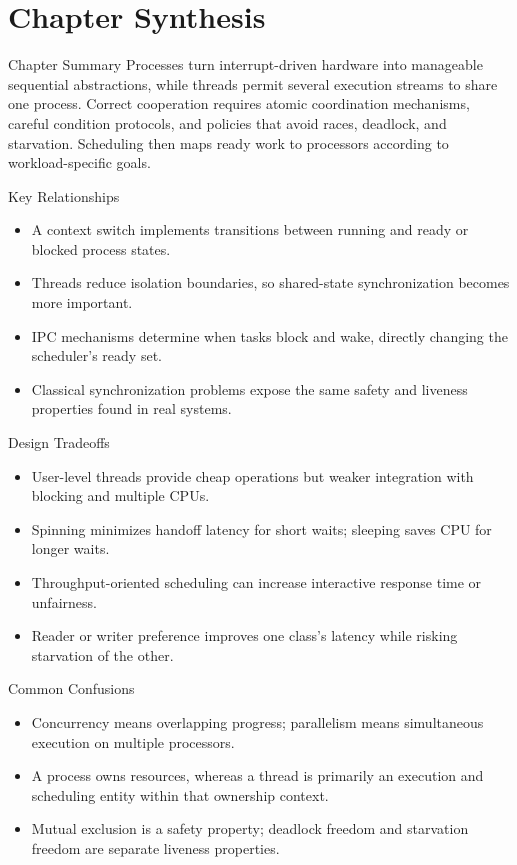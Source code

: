 \documentclass[10pt,letterpaper]{article}
\begin{document}
\section*{Chapter Synthesis}
\begin{studybox}{Chapter Summary}
Processes turn interrupt-driven hardware into manageable sequential abstractions, while threads permit several execution streams to share one process. Correct cooperation requires atomic coordination mechanisms, careful condition protocols, and policies that avoid races, deadlock, and starvation. Scheduling then maps ready work to processors according to workload-specific goals.
\end{studybox}

\begin{studybox}{Key Relationships}
\begin{itemize}
  \item A context switch implements transitions between running and ready or blocked process states.
  \item Threads reduce isolation boundaries, so shared-state synchronization becomes more important.
  \item IPC mechanisms determine when tasks block and wake, directly changing the scheduler's ready set.
  \item Classical synchronization problems expose the same safety and liveness properties found in real systems.
\end{itemize}
\end{studybox}

\begin{studybox}{Design Tradeoffs}
\begin{itemize}
  \item User-level threads provide cheap operations but weaker integration with blocking and multiple CPUs.
  \item Spinning minimizes handoff latency for short waits; sleeping saves CPU for longer waits.
  \item Throughput-oriented scheduling can increase interactive response time or unfairness.
  \item Reader or writer preference improves one class's latency while risking starvation of the other.
\end{itemize}
\end{studybox}

\begin{studybox}{Common Confusions}
\begin{itemize}
  \item Concurrency means overlapping progress; parallelism means simultaneous execution on multiple processors.
  \item A process owns resources, whereas a thread is primarily an execution and scheduling entity within that ownership context.
  \item Mutual exclusion is a safety property; deadlock freedom and starvation freedom are separate liveness properties.
\end{itemize}
\end{studybox}
\end{document}
